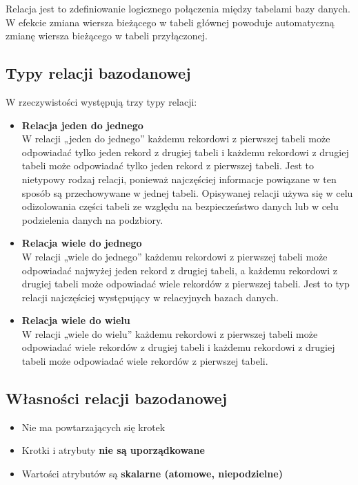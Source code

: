 \documentclass[main.tex]{subfiles}
\begin{document}
    Relacja jest to zdefiniowanie logicznego połączenia między tabelami bazy danych. W efekcie zmiana wiersza bieżącego w tabeli głównej powoduje automatyczną zmianę wiersza bieżącego w tabeli przyłączonej.

    \subsection{Typy relacji bazodanowej}

    W rzeczywistości występują trzy typy relacji:

    \begin{itemize}
        \item \textbf{Relacja jeden do jednego}\\
        W relacji „jeden do jednego” każdemu rekordowi z pierwszej tabeli może odpowiadać tylko jeden rekord z drugiej tabeli i każdemu rekordowi z drugiej tabeli może odpowiadać tylko jeden rekord z pierwszej tabeli. Jest to nietypowy rodzaj relacji, ponieważ najczęściej informacje powiązane w ten sposób są przechowywane w jednej tabeli. Opisywanej relacji używa się w celu odizolowania części tabeli ze względu na bezpieczeństwo danych lub w celu podzielenia danych na podzbiory.
        \item \textbf{Relacja wiele do jednego}\\
        W relacji „wiele do jednego” każdemu rekordowi z pierwszej tabeli może odpowiadać najwyżej jeden rekord z drugiej tabeli, a każdemu rekordowi z drugiej tabeli może odpowiadać wiele rekordów z pierwszej tabeli. Jest to typ relacji najczęściej występujący w relacyjnych bazach danych.
        \item \textbf{Relacja wiele do wielu}\\
        W relacji „wiele do wielu” każdemu rekordowi z pierwszej tabeli może odpowiadać wiele rekordów z drugiej tabeli i każdemu rekordowi z drugiej tabeli może odpowiadać wiele rekordów z pierwszej tabeli.
    \end{itemize}

    \subsection{Własności relacji bazodanowej}

    \begin{itemize}
        \item Nie ma powtarzających się krotek
        \item Krotki i atrybuty \textbf{nie są uporządkowane}
        \item Wartości atrybutów są \textbf{skalarne (atomowe, niepodzielne)}
    \end{itemize}
\end{document}
